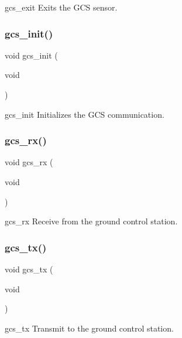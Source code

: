gcs\+\_\+exit Exits the G\+CS sensor. \mbox{\label{gcs_8c_a9b733311664e0b3d20db4dbbf766df43}} 
\subsubsection{gcs\+\_\+init()}
{\footnotesize\ttfamily void gcs\+\_\+init (\begin{DoxyParamCaption}\item[{void}]{ }\end{DoxyParamCaption})}

gcs\+\_\+init Initializes the G\+CS communication. \mbox{\label{gcs_8c_ae2602edc0d4dab57bcccbb7c9feb4dfd}} 
\subsubsection{gcs\+\_\+rx()}
{\footnotesize\ttfamily void gcs\+\_\+rx (\begin{DoxyParamCaption}\item[{void}]{ }\end{DoxyParamCaption})}

gcs\+\_\+rx Receive from the ground control station. \mbox{\label{gcs_8c_a44198c4ef9397140234bf464ed6c784a}} 
\subsubsection{gcs\+\_\+tx()}
{\footnotesize\ttfamily void gcs\+\_\+tx (\begin{DoxyParamCaption}\item[{void}]{ }\end{DoxyParamCaption})}

gcs\+\_\+tx Transmit to the ground control station. 